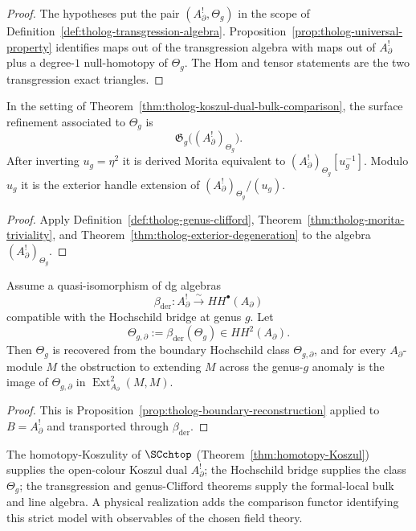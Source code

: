 \begin{proof}
The hypotheses put the pair \((A_\partial^!,\Theta_g)\) in the
scope of Definition~\ref{def:tholog-transgression-algebra}.
Proposition~\ref{prop:tholog-universal-property} identifies maps out
of the transgression algebra with maps out of \(A_\partial^!\) plus
a degree-\(1\) null-homotopy of \(\Theta_g\).  The Hom and tensor
statements are the two transgression exact triangles.
\end{proof}

\begin{theorem}
\label{thm:tholog-surface-completed-line-comparison}
In the setting of
Theorem~\ref{thm:tholog-koszul-dual-bulk-comparison}, the surface
refinement associated to \(\Theta_g\) is
\[
\mathfrak{G}_{g}\!\big((A_{\partial}^{!})_{\Theta_{g}}\big).
\]
After inverting \(u_g=\eta^2\) it is derived Morita equivalent to
\((A_\partial^!)_{\Theta_g}[u_g^{-1}]\).  Modulo \(u_g\) it is the
exterior handle extension of
\((A_\partial^!)_{\Theta_g}/(u_g)\).
\end{theorem}

\begin{proof}
Apply Definition~\ref{def:tholog-genus-clifford},
Theorem~\ref{thm:tholog-morita-triviality}, and
Theorem~\ref{thm:tholog-exterior-degeneration} to the algebra
\((A_\partial^!)_{\Theta_g}\).
\end{proof}

\begin{theorem}
\label{thm:tholog-boundary-reconstruction-comparison}
Assume a quasi-isomorphism of dg algebras
\[
\beta_{\mathrm{der}}\colon A_\partial^!
\stackrel{\sim}{\longrightarrow} HH^\bullet(A_\partial)
\]
compatible with the Hochschild bridge at genus \(g\).  Let
\[
\Theta_{g,\partial}:=\beta_{\mathrm{der}}(\Theta_g)
\in HH^2(A_\partial).
\]
Then \(\Theta_g\) is recovered from the boundary Hochschild class
\(\Theta_{g,\partial}\), and for every \(A_\partial\)-module \(M\) the
obstruction to extending \(M\) across the genus-\(g\) anomaly is the
image of \(\Theta_{g,\partial}\) in
\(\operatorname{Ext}^2_{A_\partial}(M,M)\).
\end{theorem}

\begin{proof}
This is Proposition~\ref{prop:tholog-boundary-reconstruction}
applied to \(B=A_\partial^!\) and transported through
\(\beta_{\mathrm{der}}\).
\end{proof}

\begin{remark}
\label{rem:tholog-formal-local-bulk-model}
The homotopy-Koszulity of \(\SCchtop\)
(Theorem~\ref{thm:homotopy-Koszul}) supplies the open-colour Koszul
dual \(A_\partial^!\); the Hochschild bridge supplies the class
\(\Theta_g\); the transgression and genus-Clifford theorems supply the
formal-local bulk and line algebra.  A physical realization adds the
comparison functor identifying this strict model with observables of
the chosen field theory.
\end{remark}

